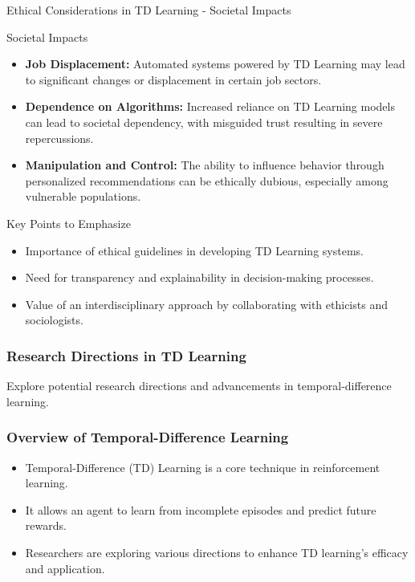 \documentclass[aspectratio=169]{beamer}
\begin{document}
\begin{frame}[fragile]{Ethical Considerations in TD Learning - Societal Impacts}
    \begin{block}{Societal Impacts}
        \begin{itemize}
            \item \textbf{Job Displacement:} Automated systems powered by TD Learning may lead to significant changes or displacement in certain job sectors.
            \item \textbf{Dependence on Algorithms:} Increased reliance on TD Learning models can lead to societal dependency, with misguided trust resulting in severe repercussions.
            \item \textbf{Manipulation and Control:} The ability to influence behavior through personalized recommendations can be ethically dubious, especially among vulnerable populations.
        \end{itemize}
    \end{block}
    
    \begin{block}{Key Points to Emphasize}
        \begin{itemize}
            \item Importance of ethical guidelines in developing TD Learning systems.
            \item Need for transparency and explainability in decision-making processes.
            \item Value of an interdisciplinary approach by collaborating with ethicists and sociologists.
        \end{itemize}
    \end{block}
\end{frame}

\begin{frame}[fragile]
    \frametitle{Research Directions in TD Learning}
    Explore potential research directions and advancements in temporal-difference learning.
\end{frame}

\begin{frame}[fragile]
    \frametitle{Overview of Temporal-Difference Learning}
    \begin{itemize}
        \item Temporal-Difference (TD) Learning is a core technique in reinforcement learning.
        \item It allows an agent to learn from incomplete episodes and predict future rewards.
        \item Researchers are exploring various directions to enhance TD learning's efficacy and application.
    \end{itemize}
\end{frame}
\end{document}
